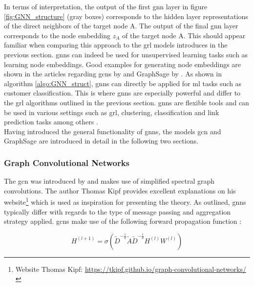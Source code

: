 	\noindent In terms of interpretation, the output of the first \acs{gnn} 
	layer in figure \ref{fig:GNN_structure} (gray boxes) corresponds to the 
	hidden layer representations of the direct neighbors of the target node A. 
	The output of the final \acs{gnn} layer corresponds to the node embedding 
	$z_{A}$ of the target node A. This should appear familiar when comparing 
	this approach to the \acs{grl} models introduces in the previous section. 
	\acsp{gnn} can indeed be used for unsupervised learning tasks such as 
	learning node embeddings. Good examples for generating node embeddings are 
	shown in the articles regarding \acsp{gcn} by \cite{kipf2016semi} and 
	GraphSage by \cite{hamilton2017inductive}. As shown in algorithm 
	\ref{algo:GNN_struct}, \acsp{gnn} can directly be applied for \acs{ml} tasks 
	such as customer classification. This is where \acsp{gnn} are especially 
	powerful and differ to the \acs{grl} algorithms outlined in the previous 
	section. \acsp{gnn} are flexible tools and can be used in various settings 
	such as \acs{grl}, clustering, classification and link prediction tasks 
	among others \citep{zhou2020graph}. \\

	\noindent Having introduced the general functionality of \acsp{gnn}, the 
	models \ac{gcn} and GraphSage are introduced in detail in the following two 
	sections. 

	\subsubsection{Graph Convolutional Networks}
	
	\noindent The \acf{gcn} was introduced by \cite{kipf2016semi} and makes use 
	of simplified spectral graph convolutions. The author Thomas Kipf 
	\citeyearpar{kipf2016online} provides excellent explanations on his
	website\footnote{Website Thomas Kipf: 
	\url{https://tkipf.github.io/graph-convolutional-networks/}} which is used 
	as inspiration for presenting the theory. As outlined, \acsp{gnn} typically 
	differ with regards to the type of message passing and aggregation strategy 
	applied. \acsp{gcn} make use of the following forward propagation function 
	\citep[p. 2]{kipf2016semi}:

	\begin{equation}
		H^{(l+1)} = \sigma\left(\tilde D^{-\frac{1}{2}}\tilde A \tilde
		D^{-\frac{1}{2}}H^{(l)}W^{(l)}\right)
		\label{eq:GCN}
	\end{equation}
	
